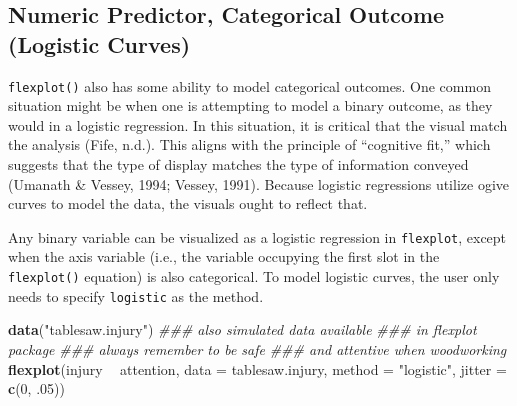 \documentclass[
  man]{apa6}
\newenvironment{Shaded}{\begin{snugshade}}{\end{snugshade}}
\newcommand{\CommentTok}[1]{\textcolor[rgb]{0.56,0.35,0.01}{\textit{#1}}}
\newcommand{\DataTypeTok}[1]{\textcolor[rgb]{0.13,0.29,0.53}{#1}}
\newcommand{\DecValTok}[1]{\textcolor[rgb]{0.00,0.00,0.81}{#1}}
\newcommand{\FloatTok}[1]{\textcolor[rgb]{0.00,0.00,0.81}{#1}}
\newcommand{\KeywordTok}[1]{\textcolor[rgb]{0.13,0.29,0.53}{\textbf{#1}}}
\newcommand{\NormalTok}[1]{#1}
\newcommand{\OperatorTok}[1]{\textcolor[rgb]{0.81,0.36,0.00}{\textbf{#1}}}
\newcommand{\StringTok}[1]{\textcolor[rgb]{0.31,0.60,0.02}{#1}}
\begin{document}
\hypertarget{numeric-predictor-categorical-outcome-logistic-curves}{%
\subsection{Numeric Predictor, Categorical Outcome (Logistic Curves)}\label{numeric-predictor-categorical-outcome-logistic-curves}}

\texttt{flexplot()} also has some ability to model categorical outcomes. One common situation might be when one is attempting to model a binary outcome, as they would in a logistic regression. In this situation, it is critical that the visual match the analysis (Fife, n.d.). This aligns with the principle of \enquote{cognitive fit,} which suggests that the type of display matches the type of information conveyed (Umanath \& Vessey, 1994; Vessey, 1991). Because logistic regressions utilize ogive curves to model the data, the visuals ought to reflect that.

Any binary variable can be visualized as a logistic regression in \texttt{flexplot}, except when the axis variable (i.e., the variable occupying the first slot in the \texttt{flexplot()} equation) is also categorical. To model logistic curves, the user only needs to specify \texttt{logistic} as the method.

\begin{Shaded}
\begin{Highlighting}[]
\KeywordTok{data}\NormalTok{(}\StringTok{"tablesaw.injury"}\NormalTok{) }\CommentTok{### also simulated data available }
                        \CommentTok{### in flexplot package}
                        \CommentTok{### always remember to be safe }
                        \CommentTok{### and attentive when woodworking}
\KeywordTok{flexplot}\NormalTok{(injury }\OperatorTok{~}\StringTok{ }\NormalTok{attention, }\DataTypeTok{data =}\NormalTok{ tablesaw.injury, }
             \DataTypeTok{method =} \StringTok{"logistic"}\NormalTok{, }\DataTypeTok{jitter =} \KeywordTok{c}\NormalTok{(}\DecValTok{0}\NormalTok{, }\FloatTok{.05}\NormalTok{))}
\end{Highlighting}
\end{Shaded}
\end{document}
